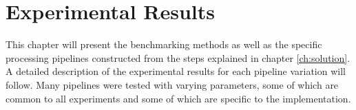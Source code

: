 \chapter{Experimental Results}\label{ch:results}

This chapter will present the benchmarking methods as well as the specific
processing pipelines constructed from the steps explained in chapter
\ref{ch:solution}. A detailed description of the experimental results for each
pipeline variation will follow. Many pipelines were tested with varying
parameters, some of which are common to all experiments and some of which are
specific to the implementation.





